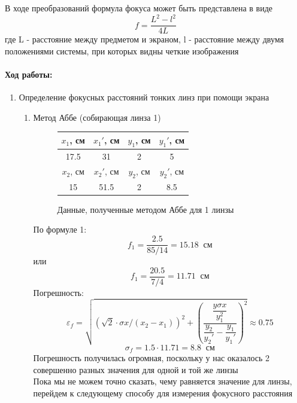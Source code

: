 \documentclass[a4paper,12pt]{article}
\begin{document}
\begin{enumerate}
В ходе преобразований формула фокуса может быть представлена в виде 
\begin{equation}
f =\frac{L^2-l^2}{4L}
\end{equation}
где L - расстояние между предметом и экраном, l - расстояние между двумя положениями системы, при которых видны четкие изображения
\end{enumerate}

\paragraph{Ход работы:}
\begin{enumerate}
\itemsep0em
\item Определение фокусных расстояний тонких линз при помощи экрана
\begin{enumerate}
\itemsep0em
\item Метод Аббе  (собирающая линза 1)
\begin{figure}[h!]
\centering
\begin{tabular}{|c|c|c|c|}
\hline 
$x_1$, см & $x_1'$, см & $y_1$, см & $y_1'$, см \\ 
\hline 
17.5 & 31 & 2 & 5 \\ 
\hline 
$x_2$, см & $x_2'$, см & $y_2$, см & $y_2'$, см \\ 
\hline 
15 & 51.5 & 2 & 8.5 \\ 
\hline 
\end{tabular}
\caption{Данные, полученные методом Аббе для 1 линзы} 
\end{figure}
По формуле 1:\\

\[f_1 = \frac{2.5}{85/14} = 15.18\;\;\text{см}\]
или
\[f_1 = \frac{20.5}{7/4} = 11.71\;\;\text{см}\]
Погрешность:\\
\[\varepsilon_f = \sqrt{(\sqrt{2}\cdot\sigma x/(x_2-x_1))^2+ (\frac{\dfrac{y\sigma x}{y_1^2}}{\dfrac{y_2}{y_2'} - \dfrac{y_1}{y_1'}})^2}\approx 0.75\]
\[\sigma_f = 1.5\cdot 11.71 = 8.8\;\;\text{см}\]
Погрешность получилась огромная, поскольку у нас оказалось 2 совершенно разных значения для одной и той же линзы\\ 
Пока мы не можем точно сказать, чему равняется значение для линзы, перейдем к следующему способу для измерения фокусного расстояния\\


\end{enumerate}
\end{enumerate}
\end{document}
